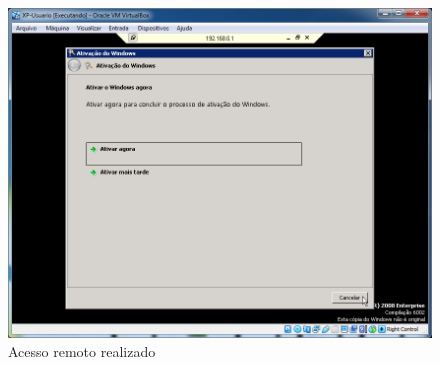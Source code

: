 \documentclass[10pt]{article}
\begin{document}
\begin{figure}[H]
    \centering
    \caption{Acesso remoto realizado}
    \label{fig:ar025}
    \includegraphics[width=\linewidth]{images/acesso_remoto/ar025.png}
\end{figure}
\end{document}
